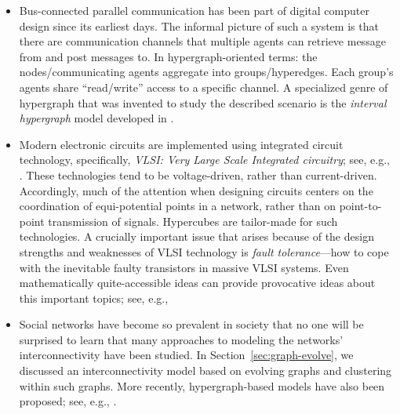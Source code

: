 \begin{itemize}
\item
Bus-connected parallel communication has been part of digital computer
 design since
its earliest days.  The informal picture of such a system is that
there are communication channels that multiple agents can retrieve
message from and post messages to.  In hypergraph-oriented terms: the
nodes/communicating agents aggregate into groups/hyperedges.  Each
group's agents share ``read/write'' access to a specific channel.  A
specialized genre of hypergraph that was invented to study the
described scenario is the {\it interval hypergraph}
 model developed in
\cite{Rosenberg89a}.

\item
Modern electronic circuits are implemented using integrated circuit
 technology,
specifically, {\em VLSI: Very Large Scale Integrated circuitry}; see,
e.g., \cite{Mead-Conway}.  These technologies tend to be
voltage-driven, rather than current-driven.  Accordingly, much of the
attention when designing circuits centers on the coordination of
equi-potential points in a network, rather than on point-to-point
transmission of signals.  Hypercubes are tailor-made for such
technologies.  A crucially important issue that arises because of the
design strengths and weaknesses of  VLSI technology is {\it fault
  tolerance}---how to cope with the inevitable faulty transistors in
massive VLSI systems.  Even mathematically quite-accessible ideas can
provide provocative ideas about this important topics; see, e.g.,
\cite{Rosenberg85a}

\item
Social networks have become so prevalent in society that no one will
be surprised to learn that many approaches to modeling the networks'
interconnectivity have been studied.  In
Section~\ref{sec:graph-evolve}, we discussed an interconnectivity
model based on evolving graphs and clustering within such graphs.
More recently, hypergraph-based models
have also been proposed; see, e.g., \cite{Amatoetal17,LiuBV10}.
\end{itemize}





